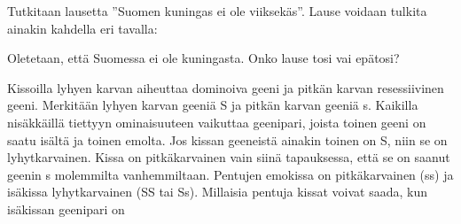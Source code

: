 \begin{tehtava}
    Tutkitaan lausetta ''Suomen kuningas ei ole viiksekäs''. Lause voidaan tulkita ainakin kahdella eri tavalla:
    \begin{alakohdat}
    \end{alakohdat}
    Oletetaan, että Suomessa ei ole kuningasta. Onko lause tosi vai epätosi?

    \begin{vastaus}
        \begin{alakohdat}
        \end{alakohdat}
    \end{vastaus}
    
\end{tehtava}

\begin{tehtava}
    Kissoilla lyhyen karvan aiheuttaa dominoiva geeni ja pitkän karvan resessiivinen geeni. Merkitään lyhyen karvan geeniä S ja pitkän karvan geeniä s. Kaikilla nisäkkäillä tiettyyn ominaisuuteen vaikuttaa geenipari, joista toinen geeni on saatu isältä ja toinen emolta. Jos kissan geeneistä ainakin toinen on S, niin se on lyhytkarvainen. Kissa on pitkäkarvainen vain siinä tapauksessa, että se on saanut geenin s molemmilta vanhemmiltaan.  Pentujen emokissa on pitkäkarvainen (ss) ja isäkissa lyhytkarvainen (SS tai Ss). Millaisia pentuja kissat voivat saada, kun isäkissan geenipari on
    \begin{alakohdat}
    \end{alakohdat}

    \begin{vastaus}
        \begin{alakohdat}
        \end{alakohdat}
    \end{vastaus}
    
\end{tehtava}

